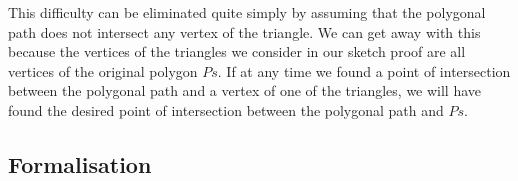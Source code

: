 

This difficulty can be eliminated quite simply by assuming that the polygonal path does not intersect any vertex of the triangle. We can get away with this because the vertices of the triangles we consider in our sketch proof are all vertices of the original polygon $Ps$. If at any time we found a point of intersection between the polygonal path and a vertex of one of the triangles, we will have found the desired point of intersection between the polygonal path and $Ps$.\label{sec:NoVertexAssumption}


\subsection{Formalisation}


